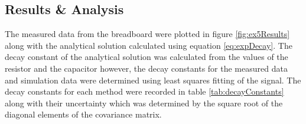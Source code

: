 \documentclass[%
reprint,
amsmath,amssymb,
aps,
floatfix
]{revtex4-2}
\begin{document}
		\subsection{Results \& Analysis}
		The measured data from the breadboard were plotted in figure \ref{fig:ex5Results} along with the analytical solution calculated using equation \ref{eq:expDecay}. The decay constant of the analytical solution was calculated from the values of the resistor and the capacitor however, the decay constants for the measured data and simulation data were determined using least squares fitting of the signal. The decay constants for each method were recorded in table \ref{tab:decayConstants} along with their uncertainty which was determined by the square root of the diagonal elements of the covariance matrix. 
		
		\begin{table}[]
			\caption{Decay constants for exercise 5. The uncertainties were determined by the square root of the diagonal elements of the covariance matrix for least squares fitting}
			\label{tab:decayConstants}
		\end{table}
		
\end{document}
